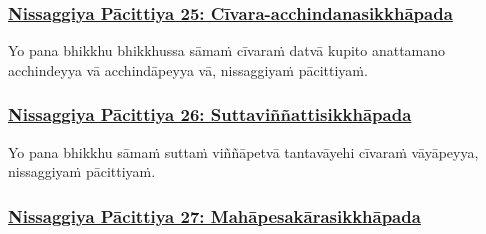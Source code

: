 \subsubsection*{\hyperref[forf-exp25]{Nissaggiya Pācittiya 25: Cīvara-acchindanasikkhāpada}}
\label{np25}

Yo pana bhikkhu bhikkhussa sāmaṁ cīvaraṁ datvā kupito\makeatletter\hyperlink{endnote208-appendix}\makeatother{} anattamano acchindeyya vā acchindāpeyya vā, nissaggiyaṁ pācittiyaṁ.



\subsubsection*{\hyperref[forf-exp26]{Nissaggiya Pācittiya 26: Suttaviññattisikkhāpada}}
\label{np26}

Yo pana bhikkhu sāmaṁ suttaṁ viññāpetvā tantavāyehi cīvaraṁ vāyāpeyya, nissaggiyaṁ pācittiyaṁ.



\subsubsection*{\hyperref[forf-exp27]{Nissaggiya Pācittiya 27: Mahāpesakārasikkhāpada}}
\label{np27}

